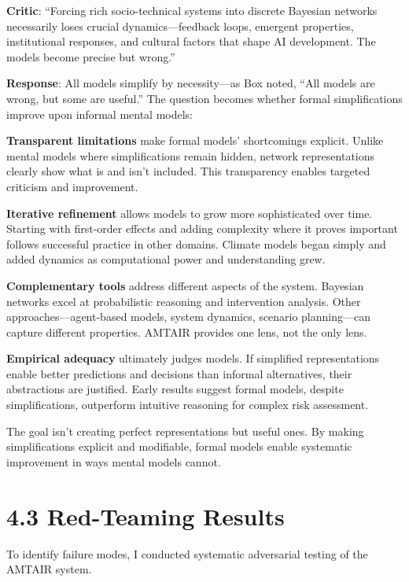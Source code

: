 \documentclass[
  11pt,
  letterpaper,
]{book}
\begin{document}
\textbf{Critic}: ``Forcing rich socio-technical systems into discrete
Bayesian networks necessarily loses crucial dynamics---feedback loops,
emergent properties, institutional responses, and cultural factors that
shape AI development. The models become precise but wrong.''

\textbf{Response}: All models simplify by necessity---as Box noted,
``All models are wrong, but some are useful.'' The question becomes
whether formal simplifications improve upon informal mental models:

\textbf{Transparent limitations} make formal models' shortcomings
explicit. Unlike mental models where simplifications remain hidden,
network representations clearly show what is and isn't included. This
transparency enables targeted criticism and improvement.

\textbf{Iterative refinement} allows models to grow more sophisticated
over time. Starting with first-order effects and adding complexity where
it proves important follows successful practice in other domains.
Climate models began simply and added dynamics as computational power
and understanding grew.

\textbf{Complementary tools} address different aspects of the system.
Bayesian networks excel at probabilistic reasoning and intervention
analysis. Other approaches---agent-based models, system dynamics,
scenario planning---can capture different properties. AMTAIR provides
one lens, not the only lens.

\textbf{Empirical adequacy} ultimately judges models. If simplified
representations enable better predictions and decisions than informal
alternatives, their abstractions are justified. Early results suggest
formal models, despite simplifications, outperform intuitive reasoning
for complex risk assessment.

The goal isn't creating perfect representations but useful ones. By
making simplifications explicit and modifiable, formal models enable
systematic improvement in ways mental models cannot.

\textcite{box1976}

\section*{4.3 Red-Teaming Results}\label{sec-red-teaming}


To identify failure modes, I conducted systematic adversarial testing of
the AMTAIR system.
\end{document}
